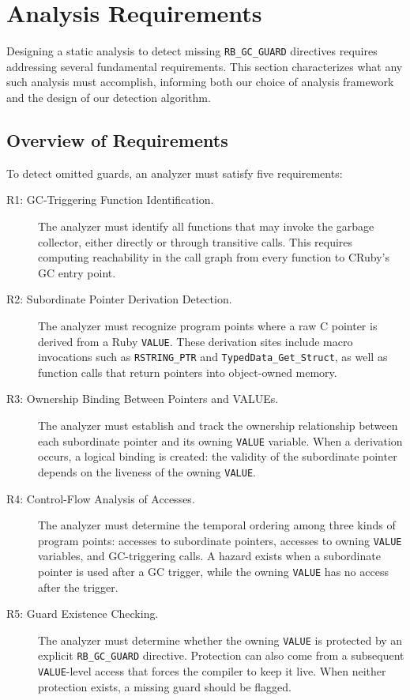 \section{Analysis Requirements}\label{sec:Requirements}

Designing a static analysis to detect missing \texttt{RB\_GC\_GUARD} directives requires addressing several fundamental requirements. This section characterizes what any such analysis must accomplish, informing both our choice of analysis framework and the design of our detection algorithm.

\subsection{Overview of Requirements}

To detect omitted guards, an analyzer must satisfy five requirements:

\begin{description}
\item[R1: GC-Triggering Function Identification.] The analyzer must identify all functions that may invoke the garbage collector, either directly or through transitive calls. This requires computing reachability in the call graph from every function to CRuby's GC entry point.

\item[R2: Subordinate Pointer Derivation Detection.] The analyzer must recognize program points where a raw C pointer is derived from a Ruby \texttt{VALUE}. These derivation sites include macro invocations such as \texttt{RSTRING\_PTR} and \texttt{TypedData\_Get\_Struct}, as well as function calls that return pointers into object-owned memory.

\item[R3: Ownership Binding Between Pointers and VALUEs.] The analyzer must establish and track the ownership relationship between each subordinate pointer and its owning \texttt{VALUE} variable. When a derivation occurs, a logical binding is created: the validity of the subordinate pointer depends on the liveness of the owning \texttt{VALUE}.

\item[R4: Control-Flow Analysis of Accesses.] The analyzer must determine the temporal ordering among three kinds of program points: accesses to subordinate pointers, accesses to owning \texttt{VALUE} variables, and GC-triggering calls. A hazard exists when a subordinate pointer is used after a GC trigger, while the owning \texttt{VALUE} has no access after the trigger.

\item[R5: Guard Existence Checking.] The analyzer must determine whether the owning \texttt{VALUE} is protected by an explicit \texttt{RB\_GC\_GUARD} directive. Protection can also come from a subsequent \texttt{VALUE}-level access that forces the compiler to keep it live. When neither protection exists, a missing guard should be flagged.
\end{description}

